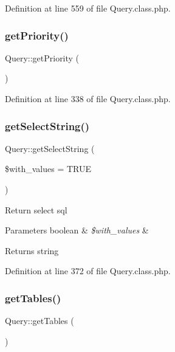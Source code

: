 Definition at line 559 of file Query.\+class.\+php.

\mbox{\label{classQuery_a7c2b595ce97f0845360e21a5e8e1216d}} 
\subsubsection{\texorpdfstring{get\+Priority()}{getPriority()}}
{\footnotesize\ttfamily Query\+::get\+Priority (\begin{DoxyParamCaption}{ }\end{DoxyParamCaption})}



Definition at line 338 of file Query.\+class.\+php.

\mbox{\label{classQuery_a85639a8e09af498d2cb4eaf61a94aa25}} 
\subsubsection{\texorpdfstring{get\+Select\+String()}{getSelectString()}}
{\footnotesize\ttfamily Query\+::get\+Select\+String (\begin{DoxyParamCaption}\item[{}]{\$with\+\_\+values = {\ttfamily TRUE} }\end{DoxyParamCaption})}

Return select sql 
\begin{DoxyParams}[1]{Parameters}
boolean & {\em \$with\+\_\+values} & \\
\hline
\end{DoxyParams}
\begin{DoxyReturn}{Returns}
string 
\end{DoxyReturn}


Definition at line 372 of file Query.\+class.\+php.

\mbox{\label{classQuery_a123bec7835d39656ce7acd1daec43a17}} 
\subsubsection{\texorpdfstring{get\+Tables()}{getTables()}}
{\footnotesize\ttfamily Query\+::get\+Tables (\begin{DoxyParamCaption}{ }\end{DoxyParamCaption})}



